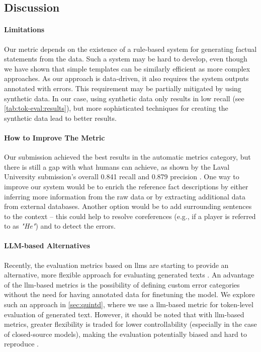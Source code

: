 \subsection{Discussion}
\paragraph{Limitations} Our metric depends on the existence of a rule-based system for generating factual statements from the data. Such a system may be hard to develop, even though we have shown that simple templates can be similarly efficient as more complex approaches. As our approach is data-driven, it also requires the system outputs annotated with errors. This requirement may be partially mitigated by using synthetic data. In our case, using synthetic data only results in low recall (see \autoref{tab:tok-eval:results}), but more sophisticated techniques for creating the synthetic data lead to better results.

\paragraph{How to Improve The Metric} Our submission achieved the best results in the automatic metrics category, but there is still a gap with what humans can achieve, as shown by the Laval University submission's overall 0.841 recall and 0.879 precision \cite{garneau2021laval}. One way to improve our system would be to enrich the reference fact descriptions by either inferring more information from the raw data or by extracting additional data from external databases. Another option would be to add surrounding sentences to the context -- this could help to resolve coreferences (e.g., if a player is referred to as \textit{"He"}) and to detect the  errors.

\paragraph{LLM-based Alternatives} Recently, the evaluation metrics based on \acp{llm} are starting to provide an alternative, more flexible approach for evaluating generated texts \cite{zhaoInvestigatingTabletoTextGeneration2023,sottanaEvaluationMetricsEra2023,chiang-lee-2023-large,fu2023gptscore}. An advantage of the \ac{llm}-based metrics is the possibility of defining custom error categories without the need for having annotated data for finetuning the model. We explore such an approach in \autoref{sec:quintd}, where we use a \ac{llm}-based metric for token-level evaluation of generated text. However, it should be noted that with \ac{llm}-based metrics, greater flexibility is traded for lower controllability (especially in the case of closed-source models), making the evaluation potentially biased and hard to reproduce \cite{stureborgLargeLanguageModels2024,kooBenchmarkingCognitiveBiases2023,wangLargeLanguageModels2023}.

